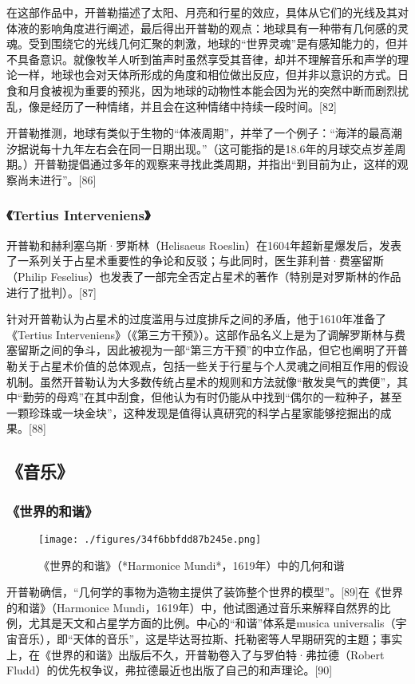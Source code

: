 在这部作品中，开普勒描述了太阳、月亮和行星的效应，具体从它们的光线及其对体液的影响角度进行阐述，最后得出开普勒的观点：地球具有一种带有几何感的灵魂。受到围绕它的光线几何汇聚的刺激，地球的“世界灵魂”是有感知能力的，但并不具备意识。就像牧羊人听到笛声时虽然享受其音律，却并不理解音乐和声学的理论一样，地球也会对天体所形成的角度和相位做出反应，但并非以意识的方式。日食和月食被视为重要的预兆，因为地球的动物性本能会因为光的突然中断而剧烈扰乱，像是经历了一种情绪，并且会在这种情绪中持续一段时间。[82]

开普勒推测，地球有类似于生物的“体液周期”，并举了一个例子：“海洋的最高潮汐据说每十九年左右会在同一日期出现。”（这可能指的是18.6年的月球交点岁差周期。）开普勒提倡通过多年的观察来寻找此类周期，并指出“到目前为止，这样的观察尚未进行”。[86]
\subsubsection{《Tertius Interveniens》}
开普勒和赫利塞乌斯·罗斯林（Helisaeus Roeslin）在1604年超新星爆发后，发表了一系列关于占星术重要性的争论和反驳；与此同时，医生菲利普·费塞留斯（Philip Feselius）也发表了一部完全否定占星术的著作（特别是对罗斯林的作品进行了批判）。[87]

针对开普勒认为占星术的过度滥用与过度排斥之间的矛盾，他于1610年准备了《Tertius Interveniens》（《第三方干预》）。这部作品名义上是为了调解罗斯林与费塞留斯之间的争斗，因此被视为一部“第三方干预”的中立作品，但它也阐明了开普勒关于占星术价值的总体观点，包括一些关于行星与个人灵魂之间相互作用的假设机制。虽然开普勒认为大多数传统占星术的规则和方法就像“散发臭气的粪便”，其中“勤劳的母鸡”在其中刮食，但他认为有时仍能从中找到“偶尔的一粒种子，甚至一颗珍珠或一块金块”，这种发现是值得认真研究的科学占星家能够挖掘出的成果。[88]
\subsection{《音乐》}
\subsubsection{《世界的和谐》}
\begin{figure}[ht]
\centering
\texttt{[image: ./figures/34f6bbfdd87b245e.png]}
\caption{《世界的和谐》（*Harmonice Mundi*，1619年）中的几何和谐} \label{fig_KPL1_15}
\end{figure}
开普勒确信，“几何学的事物为造物主提供了装饰整个世界的模型”。[89]在《世界的和谐》（Harmonice Mundi，1619年）中，他试图通过音乐来解释自然界的比例，尤其是天文和占星学方面的比例。中心的“和谐”体系是musica universalis（宇宙音乐），即“天体的音乐”，这是毕达哥拉斯、托勒密等人早期研究的主题；事实上，在《世界的和谐》出版后不久，开普勒卷入了与罗伯特·弗拉德（Robert Fludd）的优先权争议，弗拉德最近也出版了自己的和声理论。[90]

